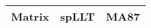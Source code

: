 \begin{tabular}{l|rr}
  \hline
  Matrix                          & spLLT     & MA87       \\
  \hline

  \hline
\end{tabular}
